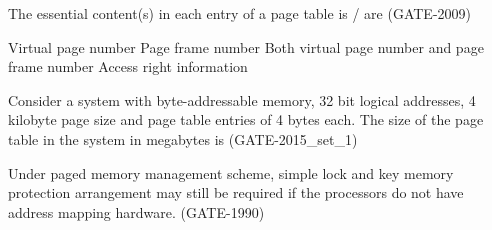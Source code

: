
\begin{questyle}

  \question  The essential content(s) in each entry of a page table is / are (GATE-2009)

  \begin{choices}
    \choice Virtual page number
    \choice Page frame number
    \choice Both virtual page number and page frame number
    \choice Access right information
  \end{choices}

\end{questyle}


\begin{questyle}

  \question  Consider a system with byte-addressable memory, 32 bit logical addresses, 4 kilobyte page size and page table entries of 4 bytes each. The size of the page table in the system in megabytes is \fillin[] (GATE-2015\_set\_1)

\end{questyle}


\begin{questyle}

  \question  Under paged memory management scheme, simple lock and key memory protection arrangement may still be required if the \fillin[] processors do not have address mapping hardware. (GATE-1990)

\end{questyle}







